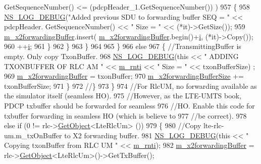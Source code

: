 \begin{DoxyCode}
      GetSequenceNumber() <= (pdcpHeader\_1.GetSequenceNumber()) )
957             \{
958               \hyperlink{group__logging_ga413f1886406d49f59a6a0a89b77b4d0a}{NS\_LOG\_DEBUG}(\textcolor{stringliteral}{"Added previous SDU to forwarding buffer SEQ = "} << pdcpHeader.
      GetSequenceNumber() << \textcolor{stringliteral}{" Size = "} << (*it)->GetSize());
959               \hyperlink{classns3_1_1UeManager_a3fb8a9dc6ef434306f90f42837f3ae83}{m\_x2forwardingBuffer}.insert(
      \hyperlink{classns3_1_1UeManager_a3fb8a9dc6ef434306f90f42837f3ae83}{m\_x2forwardingBuffer}.begin()+\hyperlink{bernuolliDistribution_8m_a6f6ccfcf58b31cb6412107d9d5281426}{i}, (*it)->Copy());
960               ++\hyperlink{bernuolliDistribution_8m_a6f6ccfcf58b31cb6412107d9d5281426}{i};
961             \}
962           \}
963         \}
964         
965       \}
966       \textcolor{keywordflow}{else} 
967       \{ \textcolor{comment}{//TransmittingBuffer is empty. Only copy TxonBuffer.}
968         \hyperlink{group__logging_ga413f1886406d49f59a6a0a89b77b4d0a}{NS\_LOG\_DEBUG}(\textcolor{keyword}{this} << \textcolor{stringliteral}{" ADDING TXONBUFFER OF RLC AM "} << 
      \hyperlink{classns3_1_1UeManager_a5a72b4fe818f21993bd7f05d7e2c4f83}{m\_rnti} << \textcolor{stringliteral}{" Size = "} << txonBufferSize) ;
969         \hyperlink{classns3_1_1UeManager_a3fb8a9dc6ef434306f90f42837f3ae83}{m\_x2forwardingBuffer} = txonBuffer;
970         \hyperlink{classns3_1_1UeManager_af9b888fa844a79c14b46c50ebae65031}{m\_x2forwardingBufferSize} += txonBufferSize;
971       \}
972     \textcolor{comment}{//\}}
973   \}
974   \textcolor{comment}{//For RlcUM, no forwarding available as the simulator itself (seamless HO).}
975   \textcolor{comment}{//However, as the LTE-UMTS book, PDCP txbuffer should be forwarded for seamless }
976   \textcolor{comment}{//HO. Enable this code for txbuffer forwarding in seamless HO (which is believe to }
977   \textcolor{comment}{//be correct).}
978   \textcolor{keywordflow}{else} \textcolor{keywordflow}{if} (0 != rlc->\hyperlink{classns3_1_1Object_a13e18c00017096c8381eb651d5bd0783}{GetObject}<LteRlcUm> ())
979   \{
980     \textcolor{comment}{//Copy lte-rlc-um.m\_txOnBuffer to X2 forwarding buffer.}
981     \hyperlink{group__logging_ga413f1886406d49f59a6a0a89b77b4d0a}{NS\_LOG\_DEBUG}(\textcolor{keyword}{this} << \textcolor{stringliteral}{" Copying txonBuffer from RLC UM "} << 
      \hyperlink{classns3_1_1UeManager_a5a72b4fe818f21993bd7f05d7e2c4f83}{m\_rnti});
982     \hyperlink{classns3_1_1UeManager_a3fb8a9dc6ef434306f90f42837f3ae83}{m\_x2forwardingBuffer} = rlc->\hyperlink{classns3_1_1Object_a13e18c00017096c8381eb651d5bd0783}{GetObject}<LteRlcUm>()->GetTxBuffer();

\end{DoxyCode}
